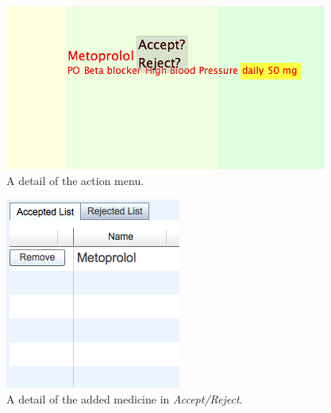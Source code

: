\documentclass{chi2009}
\newcommand{\AcceptReject}{\textit{Accept/Reject}}
\begin{document}
\begin{figure}[t]
\begin{center}
\includegraphics[width=1\linewidth]{img/menu.png}
\end{center}
   \caption{A detail of the action menu.}
   \label{fig:menu}
\end{figure}

\begin{figure}[t]
\begin{center}
\includegraphics[width=0.5\linewidth]{img/acceptlist.png}
\end{center}
   \caption{A detail of the added medicine in \AcceptReject.}
   \label{fig:acceptlist}
\end{figure}
\end{document}
